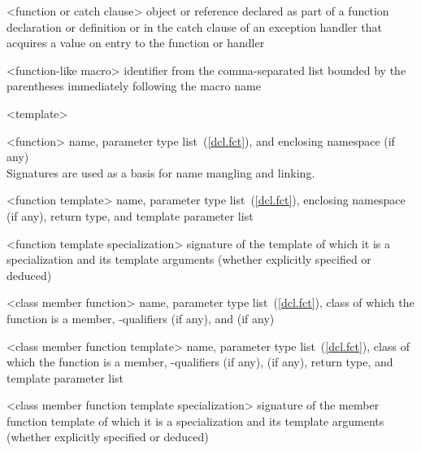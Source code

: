 %
%
%
<function or catch clause> object or reference declared as part of a function declaration or
definition or in the catch clause of an exception handler that
acquires a value on entry to the function or handler

%
%
<function-like macro> identifier from
the comma-separated list bounded by the parentheses immediately
following the macro name

%
%
<template> 

%
<function> name, parameter type list~(\ref{dcl.fct}), and enclosing namespace (if any)\\
\enternote Signatures are used as a basis for
name mangling and linking.\exitnote

%
<function template> name, parameter type list~(\ref{dcl.fct}), enclosing namespace (if any),
return type, and template parameter list

%
<function template specialization> signature of the template of which it is a specialization
and its template arguments (whether explicitly specified or deduced)

%
<class member function> name, parameter type list~(\ref{dcl.fct}), class of which the
function is a member, \cv-qualifiers (if any),
and  (if any)

%
<class member function template> name, parameter type list~(\ref{dcl.fct}), class of which the
function is a member, \cv-qualifiers (if any),
 (if any), return type, and template parameter list

%
<class member function template specialization> signature of the member function template
of which it is a specialization and its template arguments (whether explicitly specified or deduced)

